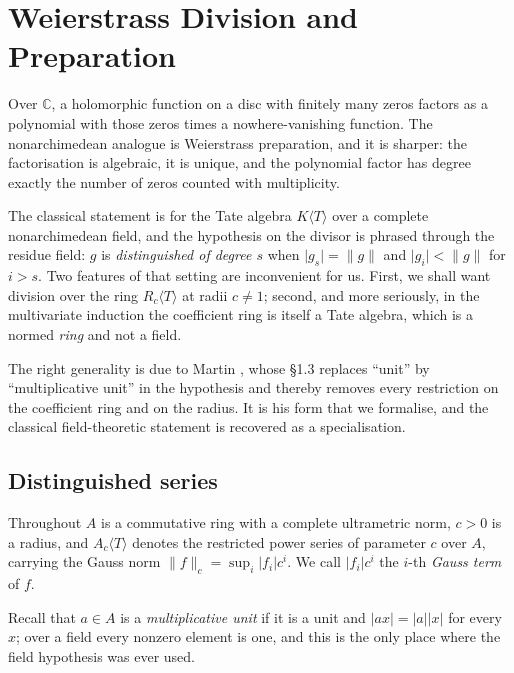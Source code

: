 \chapter{Weierstrass Division and Preparation}
\label{chap:wp}

Over $\mathbb{C}$, a holomorphic function on a disc with finitely many zeros factors as a
polynomial with those zeros times a nowhere-vanishing function.  The nonarchimedean analogue is
Weierstrass preparation, and it is sharper: the factorisation is algebraic, it is unique, and the
polynomial factor has degree exactly the number of zeros counted with multiplicity.

The classical statement is for the Tate algebra $K \langle T \rangle$ over a complete
nonarchimedean field, and the hypothesis on the divisor is phrased through the residue field:
$g$ is \emph{distinguished of degree $s$} when $\lvert g_s \rvert = \lVert g \rVert$ and
$\lvert g_i \rvert < \lVert g \rVert$ for $i > s$.  Two features of that setting are inconvenient
for us.  First, we shall want division over the ring $R_c \langle T \rangle$ at radii $c \neq 1$;
second, and more seriously, in the multivariate induction the coefficient ring is itself a Tate
algebra, which is a normed \emph{ring} and not a field.

The right generality is due to Martin \cite{Martin}, whose \S1.3 replaces ``unit'' by
``multiplicative unit'' in the hypothesis and thereby removes every restriction on the
coefficient ring and on the radius.  It is his form that we formalise, and the classical
field-theoretic statement is recovered as a specialisation.

\section{Distinguished series}

Throughout $A$ is a commutative ring with a complete ultrametric norm, $c > 0$ is a radius, and
$A_c \langle T \rangle$ denotes the restricted power series of parameter $c$ over $A$, carrying
the Gauss norm $\lVert f \rVert_c = \sup_i \lvert f_i \rvert c^i$.  We call $\lvert f_i \rvert c^i$
the $i$-th \emph{Gauss term} of $f$.

Recall that $a \in A$ is a \emph{multiplicative unit} if it is a unit and $\lvert a x\rvert =
\lvert a \rvert \lvert x \rvert$ for every $x$; over a field every nonzero element is one, and
this is the only place where the field hypothesis was ever used.

